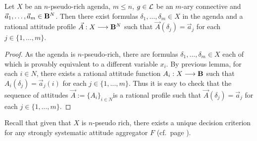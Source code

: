 \documentclass{llncs}
\numberwithin{equation}{section}
\begin{document}
\begin{lemma}\label{lemma2}
Let $X$ be an $n$-pseudo-rich agenda, $m\leq n$, $g\in \mathcal{L}$ be an $m$-ary connective and $\vec{a}_{1},\dots,\vec{a}_{m}\in \mathbf{B}^{N}$.
Then there exist formulas $\delta_{1},\dots,\delta_{m}\in X$ in the agenda and a rational attitude profile $\vec{A}:X\longrightarrow \mathbf{B}^{N}$ such that $\vec{A}(\delta_{j})=\vec{a}_{j}$ for each $j\in \{1,\dots,m\}$.
\end{lemma}
\begin{proof}
As the agenda is $n$-pseudo-rich, there are formulas $\delta_{1},\dots,\delta_{m}\in X$ each of which is provably equivalent to a different variable $x_i$. By previous lemma, for each $i\in N$, there exists a rational attitude function $A_{i}:X\longrightarrow \mathbf{B}$ such that $A_{i}(\delta_{j})=\vec{a}_{j}(i)$ for each $j\in\{1,\dots,m\}$.
Thus it is easy to check that the sequence of attitudes $\vec{A}:=\{A_{i}\}_{i\in N}$is  a rational profile such that $\vec{A}(\delta_{j})=\vec{a}_{j}$ for each $j\in\{1,\dots,m\}$.
\end{proof}

Recall that given that $X$ is $n$-pseudo rich, there exists a unique decision criterion for any strongly systematic attitude aggregator $F$ (cf.\ page \pageref{page:unique:decision:criterion}).
\end{document}
